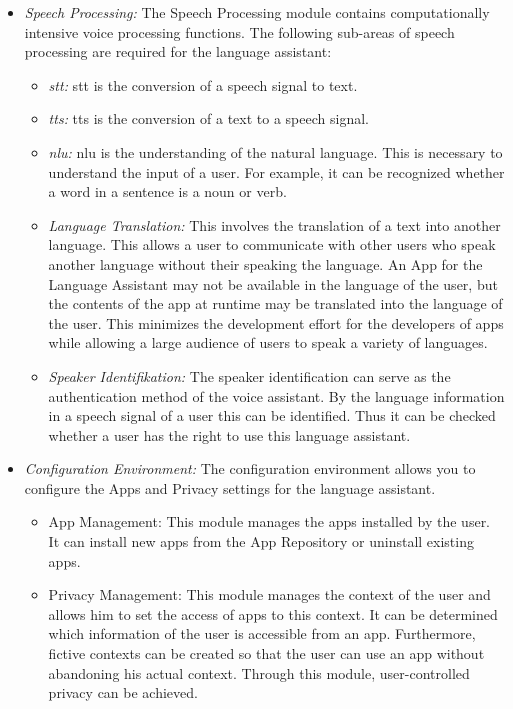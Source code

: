 \begin{itemize}
	\item \textsl{Speech Processing:} The Speech Processing module contains computationally intensive voice processing functions. The following sub-areas of speech processing are required for the language assistant:
	\begin{itemize}
		\item \textsl{\ac{stt}:} \ac{stt} is the conversion of a speech signal to text.
		\item \textsl{\ac{tts}:} \ac{tts} is the conversion of a text to a speech signal.
		\item \textsl{\ac{nlu}:} \ac{nlu} is the understanding of the natural language. This is necessary to understand the input of a user. For example, it can be recognized whether a word in a sentence is a noun or verb.
		\item \textsl{Language Translation:} This involves the translation of a text into another language. This allows a user to communicate with other users who speak another language without their speaking the language. An App for the Language Assistant may not be available in the language of the user, but the contents of the app at runtime may be translated into the language of the user. This minimizes the development effort for the developers of apps while allowing a large audience of users to speak a variety of languages.
		\item \textsl{Speaker Identifikation:} The speaker identification can serve as the authentication method of the voice assistant. By the language information in a speech signal of a user this can be identified. Thus it can be checked whether a user has the right to use this language assistant.
	\end{itemize}
	\item \textsl{Configuration Environment:} The configuration environment allows you to configure the Apps and Privacy settings for the language assistant.
	\begin{itemize}
		\item App Management: This module manages the apps installed by the user. It can install new apps from the App Repository or uninstall existing apps.
		\item Privacy Management: This module manages the context of the user and allows him to set the access of apps to this context. It can be determined which information of the user is accessible from an app. Furthermore, fictive contexts can be created so that the user can use an app without abandoning his actual context. Through this module, user-controlled privacy can be achieved. 
	\end{itemize}	
\end{itemize}





